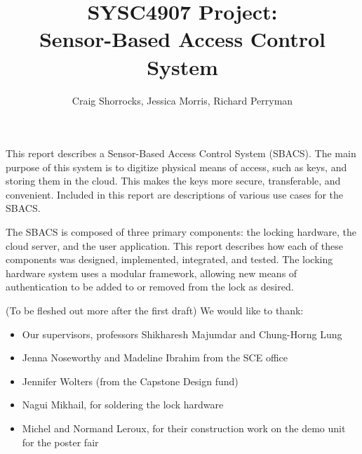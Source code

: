 \documentclass[12pt]{report}
\begin{document}
\title{SYSC4907 Project: \\ Sensor-Based Access Control System}
\author{
    Craig Shorrocks,
    Jessica Morris,
    Richard Perryman
}

\copyrightfalse %

\beforepreface



This report describes a Sensor-Based Access Control System (SBACS). The main purpose of this system is to digitize 
physical means of access, such as keys, and storing them in the cloud. This makes the keys more secure, transferable, 
and convenient. Included in this report are descriptions of various use cases for the SBACS.

The SBACS is composed of three primary components: the locking hardware, the cloud server, and the user application. 
This report describes how each of these components was designed, implemented, integrated, and tested. The locking 
hardware system uses a modular framework, allowing new means of authentication to be added to or removed from the lock 
as desired.


    (To be fleshed out more after the first draft)
    We would like to thank:
    \begin{itemize}
    \item Our supervisors, professors Shikharesh Majumdar and Chung-Horng Lung
    \item Jenna Noseworthy and Madeline Ibrahim from the SCE office
    \item Jennifer Wolters (from the Capstone Design fund)
    \item Nagui Mikhail, for soldering the lock hardware
    \item Michel and Normand Leroux, for their construction work on the demo unit for the poster fair
    \end{itemize}
	
\end{document}
